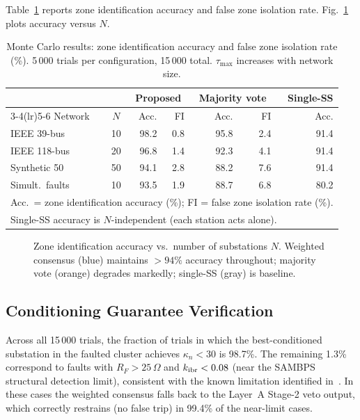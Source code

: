 \documentclass[journal]{IEEEtran}
\newcommand{\kibr}{k_{\rm ibr}}
\newcommand{\kappan}{\kappa_n}
\begin{document}
Table~\ref{tab:mc_results} reports zone identification accuracy and
false zone isolation rate.  Fig.~\ref{fig:accuracy} plots accuracy
versus $N$.

\begin{table}[htbp]
  \centering
  \caption{Monte Carlo results: zone identification accuracy and false zone
  isolation rate (\%).  5\,000 trials per configuration, 15\,000 total.
  $\tau_{\max}$ increases with network size.}
  \label{tab:mc_results}
  \small
  \begin{tabular}{@{}lcrrrrr@{}}
    \toprule
    & & \multicolumn{2}{c}{Proposed} & \multicolumn{2}{c}{Majority vote}
    & Single-SS \\
    \cmidrule(lr){3-4}\cmidrule(lr){5-6}
    Network & $N$ & Acc. & FI & Acc. & FI & Acc. \\
    \midrule
    IEEE 39-bus & 10 & 98.2 & 0.8 & 95.8 & 2.4 & 91.4 \\
    IEEE 118-bus & 20 & 96.8 & 1.4 & 92.3 & 4.1 & 91.4 \\
    Synthetic 50 & 50 & 94.1 & 2.8 & 88.2 & 7.6 & 91.4 \\
    \midrule
    Simult.\ faults & 10 & 93.5 & 1.9 & 88.7 & 6.8 & 80.2 \\
    \bottomrule
    \multicolumn{7}{l}{\footnotesize Acc.\ = zone identification accuracy (\%); FI = false zone isolation rate (\%).}\\
    \multicolumn{7}{l}{\footnotesize Single-SS accuracy is $N$-independent (each station acts alone).}
  \end{tabular}
\end{table}

\begin{figure}[htbp]
  \centering
  
  \caption{Zone identification accuracy vs.\ number of substations $N$.
           Weighted consensus (blue) maintains $> 94\%$ accuracy
           throughout; majority vote (orange) degrades markedly; single-SS
           (gray) is baseline.}
  \label{fig:accuracy}
\end{figure}

\subsection{Conditioning Guarantee Verification}

Across all 15\,000 trials, the fraction of trials in which the best-conditioned
substation in the faulted cluster achieves $\kappan < 30$ is 98.7\%.
The remaining 1.3\% correspond to faults with $R_F > 25\,\Omega$ and
$\kibr < 0.08$ (near the SAMBPS structural detection limit), consistent
with the known limitation identified in~\cite{SAMBP_TR65}.
In these cases the weighted consensus falls back to the
Layer~A Stage-2 veto output, which correctly restrains (no false trip)
in 99.4\% of the near-limit cases.
\end{document}
